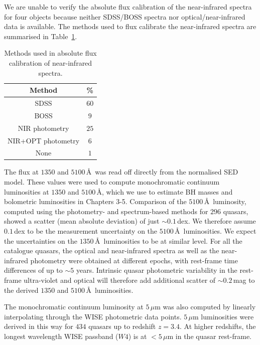 We are unable to verify the absolute flux calibration of the near-infrared spectra for four objects because neither SDSS/BOSS spectra nor optical/near-infrared data is available. 
The methods used to flux calibrate the near-infrared spectra are summarised in Table~\ref{tab:flux_calibration}. 

\begin{table}
  \centering
  \footnotesize 
  \caption{Methods used in absolute flux calibration of near-infrared spectra.}
  \label{tab:flux_calibration}
    \begin{tabular}{cc} 
    \hline
    Method & \% \\
    \hline
    SDSS               & $60$ \\
    BOSS               & $9$ \\
    NIR photometry     & $25$ \\
    NIR+OPT photometry & $6$ \\
    None               & $1$ \\    
    \hline
    \end{tabular}
\end{table} 

The flux at $1350$ and $5100$\,\AA\, was read off directly from the normalised SED model.
These values were used to compute monochromatic continuum luminosities at $1350$ and $5100$\,\AA, which we use to estimate BH masses and bolometric luminosities in Chapters 3-5. 
Comparison of the $5100$\,\AA\, luminosity, computed using the photometry- and spectrum-based methods for $296$ quasars, showed a scatter (mean absolute deviation) of just $\sim0.1$\,dex.
We therefore assume $0.1$\,dex to be the measurement uncertainty on the $5100$\,\AA\, luminosities.
We expect the uncertainties on the $1350$\,\AA\, luminosities to be at similar level.  
For all the catalogue quasars, the optical and near-infrared spectra as well as the near-infrared photometry were obtained at different epochs, with rest-frame time differences of up to $\sim5$ years. 
Intrinsic quasar photometric variability in the rest-frame ultra-violet and optical will therefore add additional scatter of $\sim0.2$\,mag \citep[e.g.][]{macleod10} to the derived $1350$ and $5100$\,\AA\, luminosities.

The monochromatic continuum luminosity at $5$\,$\mu$m was also computed by linearly interpolating through the WISE photometric data points. 
$5$\,$\mu$m luminosities were derived in this way for $434$ quasars up to redshift $z=3.4$. 
At higher redshifts, the longest wavelength WISE passband ($W4$) is at $<5$\,$\mu$m in the quasar rest-frame.


